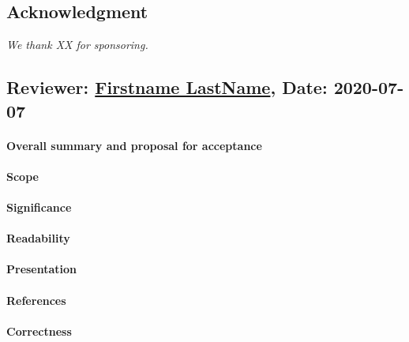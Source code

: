 \documentclass{jhps}
\begin{document}
\subsection*{Acknowledgment} %
\textit{We thank XX for sponsoring.}



\reviews   %

\subsection*{Reviewer: \href{Optional URL to reviewer page}{Firstname LastName}, Date: 2020-07-07}

\paragraph{Overall summary and proposal for acceptance}

\paragraph{Scope}   %

\paragraph{Significance}   %

\paragraph{Readability}   %

\paragraph{Presentation}

\paragraph{References}   %

\paragraph{Correctness}   %
\end{document}
